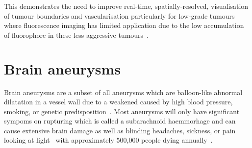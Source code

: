 This demonstrates the need to improve real-time, spatially-resolved, visualisation of tumour boundaries and vascularisation particularly for low-grade tumours where fluorescence imaging has limited application due to the low accumulation of fluorophore in these less aggressive tumours~\cite{Belykh2023, Kiesel2021}. 

\section{Brain aneurysms}
Brain aneurysms are a subset of all aneurysms which are balloon-like abnormal dilatation in a vessel wall due to a weakened caused by high blood pressure, smoking, or genetic predisposition~\cite{NationalHealthService2022}. Most aneurysms will only have significant sympoms on rupturing which is called a subarachnoid haemmorhage and can cause extensive brain damage as well as blinding headaches, sickness, or pain looking at light~\cite{NationalHealthService2022} with approximately 500,000 people dying annually~\cite{Toth2018}. 


